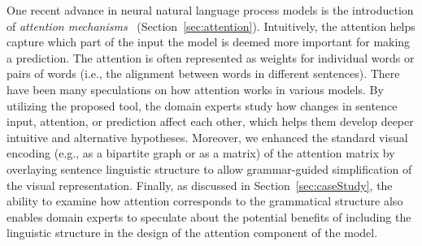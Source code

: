 One recent advance in neural natural language process models is the introduction of \emph{attention mechanisms}~\cite{VaswaniShazeerParmar2017} (Section~\ref{sec:attention}). Intuitively, the attention helps capture which part of the input the model is deemed more important for making a prediction. The attention is often represented as weights for individual words or pairs of words (i.e., the alignment between words in different sentences).
%
There have been many speculations on how attention works in various models. By utilizing the proposed tool, the domain experts study how changes in sentence input, attention, or prediction affect each other, which helps them develop deeper intuitive and alternative hypotheses. 
Moreover, we enhanced the standard visual encoding (e.g., as a bipartite graph or as a matrix) of the attention matrix by overlaying sentence linguistic structure to allow grammar-guided simplification of the visual representation.
%
Finally, as discussed in Section~\ref{sec:caseStudy}, the ability to examine how attention corresponds to the grammatical structure also enables domain experts to speculate about the potential benefits of including the linguistic structure in the design of the attention component of the model.

